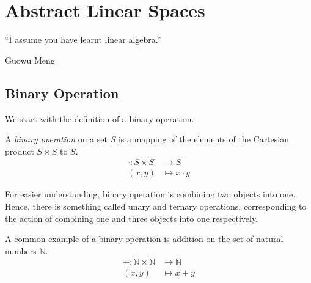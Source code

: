 \documentclass[
	11pt, %
	fleqn, %
	a4paper, %
]{LegrandOrangeBook}
\begin{document}

\chapterspaceabove{8cm} %
\chapterspacebelow{8cm} %

\chapter{Abstract Linear Spaces}

\epigraph{``I assume you have learnt linear algebra.''}{Guowu Meng}

\section{Binary Operation}

We start with the definition of a binary operation.

\begin{definition}
    A \emph{binary operation} on a set $S$ is a mapping of the elements of the Cartesian product $S \times S$ to $S$.
    \[ \begin{split}
            \cdot : S \times S & \to S \\ (x,y) &\mapsto x \cdot y
        \end{split}\]
\end{definition}

For easier understanding, binary operation is combining two objects into one. Hence, there is something called unary and ternary operations, corresponding to the action of combining one and three objects into one respectively.

\begin{example}
    A common example of a binary operation is addition on the set of natural numbers $\mathbb{N}$.
    \begin{equation}
        \begin{split}
            + : \mathbb{N} \times \mathbb{N} & \to \mathbb{N} \\ (x,y) &\mapsto x+y
        \end{split}
    \end{equation}
\end{example}
\end{document}
